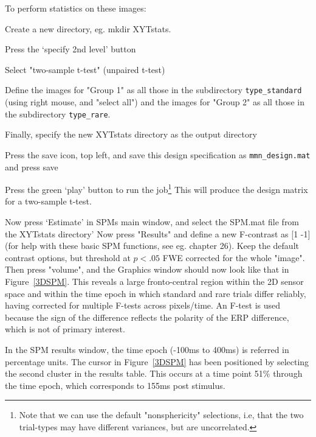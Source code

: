 To perform statistics on these images:
\bi
\item{Create a new directory, eg. mkdir XYTstats.}
\item{Press the `specify 2nd level' button}
\item{Select "two-sample t-test" (unpaired t-test)}
\item{Define the images for "Group 1" as all those in the subdirectory \texttt{type\_standard} (using right mouse, and "select all") and the images for "Group 2" as all those in the subdirectory \texttt{type\_rare}.}
\item{Finally, specify the new XYTstats directory as the output directory}
    \item{Press the save icon, top left, and save this design specification as \texttt{mmn\_design.mat} and press save}
\item{Press the green `play' button to run the job\footnote{Note that we can use the default "nonsphericity" selections, i.e, that the two trial-types may have different variances, but are uncorrelated.} This will produce the design matrix for a two-sample t-test.} 
\item{Now press `Estimate' in SPMs main window, and select the SPM.mat file from the XYTstats directory'}
\ei
 Now press "Results" and define a new F-contrast as [1 -1] (for help with these basic SPM functions, see eg. chapter 26). Keep the default contrast options, but threshold at $p<.05$ FWE corrected for the whole "image". Then press "volume", and the Graphics window should now look like that in Figure~\ref{3DSPM}. This reveals a large fronto-central region within the 2D sensor space and within the time epoch in which standard and rare trials differ reliably, having corrected for multiple F-tests across pixels/time.
 An F-test is used because the sign of the difference reflects the polarity of the ERP difference, which is not of primary interest.
 
 In the SPM results window, the time epoch (-100ms to 400ms) is referred in percentage units. The cursor in Figure~\ref{3DSPM} has been positioned by selecting the second cluster in the results table. This occurs at a time point 51\% through the time epoch, which corresponds to 155ms post stimulus.
 

